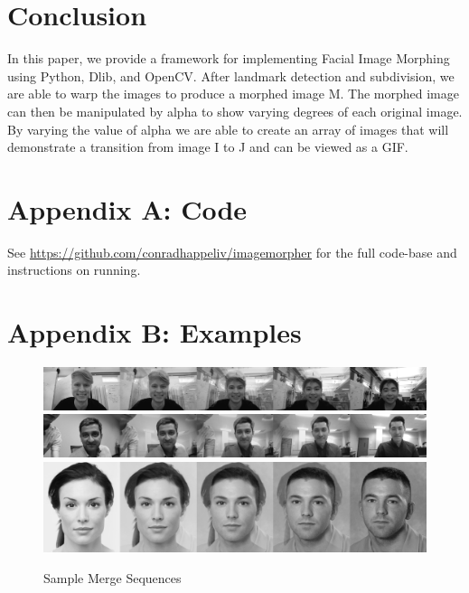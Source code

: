 \documentclass[journal]{IEEEtran}
\begin{document}
\section{Conclusion}
In this paper, we provide a framework for implementing Facial Image Morphing using Python, Dlib, and OpenCV. After landmark detection and subdivision, we are able to warp the images to produce a morphed image M. The morphed image can then be manipulated by alpha to show varying degrees of each original image.  By varying the value of alpha we are able to create an array of images that will demonstrate a transition from image I to J and can be viewed as a GIF.

\section{Appendix A: Code}
See \url{https://github.com/conradhappeliv/imagemorpher} for the full code-base and instructions on running.






\section{Appendix B: Examples}
\begin{figure}[!t]\label{fig:merge}
	\includegraphics[width = \linewidth]{sample1}
	\includegraphics[width = \linewidth]{sample2}
	\includegraphics[width = \linewidth]{sample3}
	\caption{Sample Merge Sequences}
\end{figure}

\end{document}
